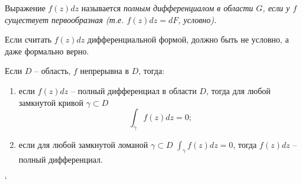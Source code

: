 \begin{definition}
	Выражение $f(z) dz$ называется \it{полным дифференциалом в области $G$}, если у $f$ существует первообразная (т.е. $f(z) dz = dF$, условно).
\end{definition}
\begin{anote}
	Если считать $f(z) dz$ дифференциальной формой, должно быть не условно, а даже формально верно.
\end{anote}

\begin{theorem}
	Если $D$ -- область, $f$ непрерывна в $D$, тогда:
	\begin{enumerate}[label=(\arabic*)]
		\item если $f(z) dz$ -- полный дифференциал в области $D$, тогда для любой замкнутой кривой $\gamma \subset D$
		\[
			\int_\gamma f(z) dz = 0;
		\]
		\item если для любой замкнутой ломаной $\gamma \subset D$ $\int_\gamma f(z) dz = 0$, тогда $f(z) dz$ -- полный дифференциал.
	\end{enumerate}`
\end{theorem}
